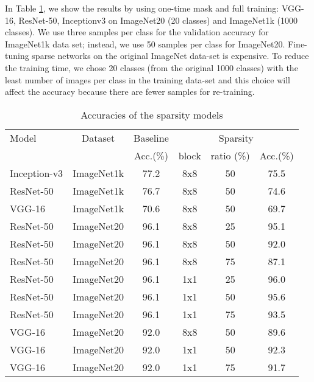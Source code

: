 \documentclass[sigconf]{acmart}
\begin{document}
In Table \ref{tab_acc}, we show the results by using one-time mask
and full training: VGG-16, ResNet-50, Inceptionv3 on ImageNet20 (20
classes) and ImageNet1k (1000 classes).  We use three samples per
class for the validation accuracy for ImageNet1k data set; instead, we
use 50 samples per class for ImageNet20. Fine-tuning sparse networks
on the original ImageNet data-set \cite{deng2009imagenet} is
expensive. To reduce the training time, we chose 20 classes (from the
original 1000 classes) with the least number of images per class in
the training data-set and this choice will affect the accuracy because
there are fewer samples for re-training.


\begin{table}[ht]
\caption{Accuracies of the sparsity models}
\label{tab_acc}
\begin{center} 
\scalebox{0.9}
{
\begin{tabular}{|l|c|c|c|c|c|}
\hline
\rule[-1ex]{0pt}{3.5ex}  Model & Dataset & Baseline  & \multicolumn{3}{c|}{Sparsity}\\
\rule[-1ex]{0pt}{3.5ex}  {} & {} & Acc.(\%) & block & ratio (\%) & Acc.(\%)    \\\hline\hline
\rule[-1ex]{0pt}{3.5ex}  Inception-v3 & ImageNet1k & 77.2 & 8x8 & 50 & 75.5  \\\hline
\rule[-1ex]{0pt}{3.5ex}  ResNet-50 & ImageNet1k & 76.7 & 8x8 & 50 & 74.6  \\\hline
\rule[-1ex]{0pt}{3.5ex}  VGG-16    & ImageNet1k & 70.6 & 8x8 & 50 & 69.7  \\\hline \hline
\rule[-1ex]{0pt}{3.5ex}  ResNet-50 & ImageNet20 & 96.1 & 8x8 & 25 & 95.1  \\\hline
\rule[-1ex]{0pt}{3.5ex}  ResNet-50 & ImageNet20 & 96.1 & 8x8 & 50 & 92.0  \\\hline
\rule[-1ex]{0pt}{3.5ex}  ResNet-50 & ImageNet20 & 96.1 & 8x8 & 75 & 87.1  \\\hline
\rule[-1ex]{0pt}{3.5ex}  ResNet-50 & ImageNet20 & 96.1 & 1x1 & 25 & 96.0  \\\hline
\rule[-1ex]{0pt}{3.5ex}  ResNet-50 & ImageNet20 & 96.1 & 1x1 & 50 & 95.6  \\\hline
\rule[-1ex]{0pt}{3.5ex}  ResNet-50 & ImageNet20 & 96.1 & 1x1 & 75 & 93.5  \\\hline
\rule[-1ex]{0pt}{3.5ex}  VGG-16    & ImageNet20 & 92.0 & 8x8 & 50 & 89.6  \\\hline
\rule[-1ex]{0pt}{3.5ex}  VGG-16    & ImageNet20 & 92.0 & 1x1 & 50 & 92.3  \\\hline
\rule[-1ex]{0pt}{3.5ex}  VGG-16    & ImageNet20 & 92.0 & 1x1 & 75 & 91.7  \\\hline
\end{tabular}\vspace{-20pt}
}
\end{center}
\end{table}
\end{document}

